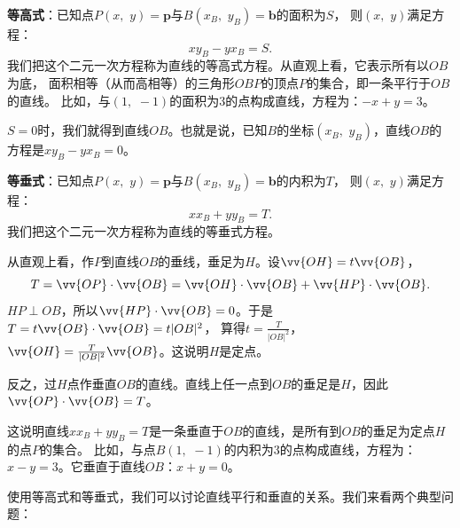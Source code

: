 \documentclass[12pt,UTF8]{ctexbook}
\begin{document}
\textbf{等高式}：已知点$P(x,\,\, y) = \mathbf{p}$与$B(x_B,\,\, y_B) = \mathbf{b}$的面积为$S$，
则$(x,\,\,y)$满足方程：
$$x y_B - y x_B = S.$$
我们把这个二元一次方程称为直线的等高式方程。从直观上看，它表示所有以$OB$为底，
面积相等（从而高相等）的三角形$OBP$的顶点$P$的集合，即一条平行于$OB$的直线。
比如，与$(1,\,\,-1)$的面积为$3$的点构成直线，方程为：$-x + y = 3$。

$S=0$时，我们就得到直线$OB$。也就是说，已知$B$的坐标$(x_B,\,\, y_B)$，直线$OB$的方程是$x y_B - y x_B = 0$。

\textbf{等垂式}：已知点$P(x, \,\,y) = \mathbf{p}$与$B(x_B, \,\,y_B) = \mathbf{b}$的内积为$T$，
则$(x,\,\,y)$满足方程：
$$x x_B + y y_B = T.$$
我们把这个二元一次方程称为直线的等垂式方程。

从直观上看，作$P$到直线$OB$的垂线，垂足为$H$。设$\vv{OH} = t \vv{OB}$，
$$ T = \vv{OP} \cdot \vv{OB} = \vv{OH} \cdot \vv{OB} + \vv{HP} \cdot \vv{OB}.$$
$ HP \perp OB$，所以$\vv{HP} \cdot \vv{OB} = 0$。于是$T = t \vv{OB} \cdot \vv{OB} = t|OB|^2$，
算得$t = \frac{T}{|OB|^2}$，$\vv{OH} = \frac{T}{|OB|^2} \vv{OB}$。这说明$H$是定点。

反之，过$H$点作垂直$OB$的直线。直线上任一点到$OB$的垂足是$H$，因此$\vv{OP} \cdot \vv{OB} = T$。

这说明直线$x x_B + y y_B = T$是一条垂直于$OB$的直线，是所有到$OB$的垂足为定点$H$的点$P$的集合。
比如，与点$B(1,\,\,-1)$的内积为$3$的点构成直线，方程为：$x - y = 3$。它垂直于直线$OB$：$x + y = 0$。

使用等高式和等垂式，我们可以讨论直线平行和垂直的关系。我们来看两个典型问题：
\end{document}
